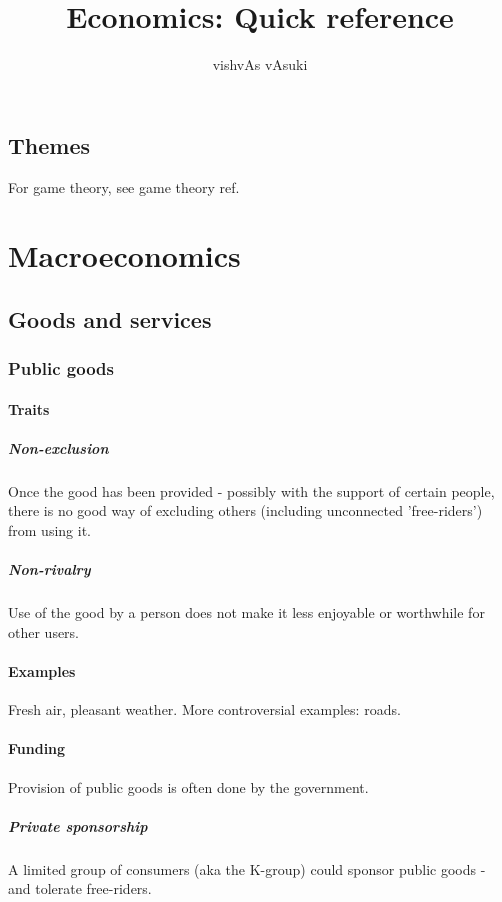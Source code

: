 \documentclass[oneside, article]{memoir}
\title{Economics: Quick reference}
\author{vishvAs vAsuki}
\begin{document}
\maketitle

\chapter{Themes}
For game theory, see game theory ref.

\part{Macroeconomics}
\chapter{Goods and services}
\section{Public goods}
\subsection{Traits}
\subsubsection{Non-exclusion}
Once the good has been provided - possibly with the support of certain people, there is no good way of excluding others (including unconnected 'free-riders') from using it.

\subsubsection{Non-rivalry}
Use of the good by a person does not make it less enjoyable or worthwhile for other users. 

\subsection{Examples}
Fresh air, pleasant weather. More controversial examples: roads.

\subsection{Funding}
Provision of public goods is often done by the government.

\subsubsection{Private sponsorship}
A limited group of consumers (aka the K-group) could sponsor public goods - and tolerate free-riders.
\end{document}
